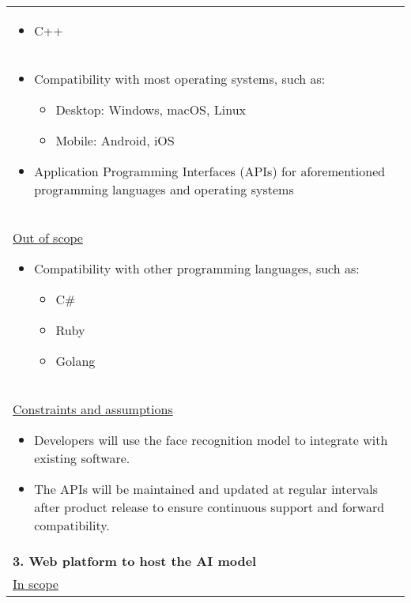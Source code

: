 \begin{longtable}{ | p{} l | }
{\begin{itemize}
\begin{itemize}
                    \item C++
                \end{itemize}
        \end{itemize}
    } \\
    \multicolumn{2}{|p{\textwidth}|}{
        \begin{itemize}
            \item Compatibility with most operating systems, such as:
                \begin{itemize}
                    \item Desktop: Windows, macOS, Linux
                    \item Mobile: Android, iOS
                \end{itemize}
            \item Application Programming Interfaces (APIs) for aforementioned programming languages and operating systems
        \end{itemize}
    } \\
    \multicolumn{2}{|p{\textwidth}|}{\hspace{0.6cm}\underline{Out of scope}
        \begin{itemize}
            \item Compatibility with other programming languages, such as:
                \begin{itemize}
                    \item C\#
                    \item Ruby
                    \item Golang
                \end{itemize}
        \end{itemize}
    } \\
    \multicolumn{2}{|p{\textwidth}|}{\hspace{0.6cm}\underline{Constraints and assumptions}
        \begin{itemize}
            \item Developers will use the face recognition model to integrate with existing software.
            \item The APIs will be maintained and updated at regular intervals after product release to ensure continuous support and forward compatibility.
        \end{itemize}
    } \\
    \multicolumn{2}{|p{\textwidth}|}{\textbf{3. Web platform to host the AI model}} \\
    \multicolumn{2}{|p{\textwidth}|}{\hspace{0.6cm}\underline{In scope}
}
\end{longtable}
